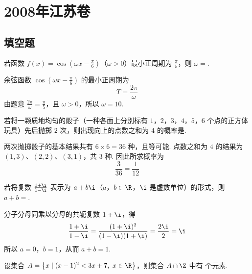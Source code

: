 \chapter{2008年江苏卷}

\section{填空题}

\begin{problem}
若函数 \( f(x) = \cos \left( \omega x - \frac{\pi}{6} \right) \)（\(\omega > 0\)）最小正周期为 \( \frac{\pi}{5} \)，则 \( \omega = \)\fillinblank{}.
\end{problem}


\begin{solution}
余弦函数 \(\cos\left(\omega x-\frac{\pi}{6}\right)\) 的最小正周期为
\[
T=\frac{2\pi}{\omega}
\]
由题意 \(\frac{2\pi}{\omega}=\frac{\pi}{5}\)，且 \(\omega>0\)，所以 \(\omega=10\).
\end{solution}

\begin{problem}
若将一颗质地均匀的骰子（一种各面上分别标有 \(1\)，\(2\)，\(3\)，\(4\)，\(5\)，\(6\) 个点的正方体玩具）先后抛掷 \(2\) 次，则出现向上的点数之和为 \(4\) 的概率是\fillinblank{}.
\end{problem}


\begin{solution}
两次抛掷骰子的基本结果共有 \(6\times6=36\) 种，且等可能. 点数之和为 \(4\) 的结果为 \(\left(1,3\right)\)、\(\left(2,2\right)\)、\(\left(3,1\right)\)，共 \(3\) 种. 因此所求概率为
\[
\frac{3}{36}=\frac{1}{12}
\]
\end{solution}

\begin{problem}
若将复数 \(\frac{1 + \i}{1 - \i}\) 表示为 \(a + b\i\)（\(a\)，\(b \in \R\)，\(\i\) 是虚数单位）的形式，则 \(a + b = \)\fillinblank{}.
\end{problem}


\begin{solution}
分子分母同乘以分母的共轭复数 \(1+\i\)，得
\[
\frac{1+\i}{1-\i}=\frac{(1+\i)^2}{(1-\i)(1+\i)}=\frac{2\i}{2}=\i
\]
所以 \(a=0\)，\(b=1\)，从而 \(a+b=1\).
\end{solution}

\begin{problem}
设集合 \(A = \left\{x \mid (x - 1)^2 < 3x + 7,\ x \in \R\right\}\)，则集合 \(A \cap \Z\) 中有\fillinblank{} 个元素.
\end{problem}

